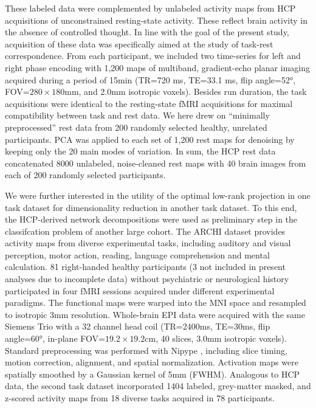 \documentclass{article} %
\begin{document}
These labeled data were complemented by unlabeled activity maps
from HCP acquisitions of unconstrained resting-state activity.
These reflect brain activity in the absence of controlled thought.
In line with the goal of the present study, acquisition of these data was
specifically aimed at the study of task-rest correspondence.
From each participant, we included two
time-series for left and right phase encoding
with 1,200 maps of multiband, gradient-echo planar imaging acquired
during a period of 15min (TR=720 ms, TE=33.1 ms, flip angle=52°,
FOV=$280\times180$mm, and 2.0mm isotropic voxels). Besides run duration,
the task acquisitions were identical to the resting-state fMRI acquisitions
for maximal compatibility between task and rest data.
We here drew on ``minimally preprocessed'' rest data
from 200 randomly selected healthy, unrelated participants.
PCA was applied to each set of 1,200 rest maps for
denoising by keeping only the 20 main modes of
variation.
In sum, the HCP rest data concatenated
8000 unlabeled, noise-cleaned rest maps with
40 brain images from each of 200 randomly selected participants.

We were further interested in the utility of the optimal low-rank projection
in one task dataset for dimensionality reduction in another task dataset.
To this end, the HCP-derived network decompositions were used as preliminary
step in the classifcation problem of another large cohort.
The ARCHI dataset \cite{pinel07} provides activity maps from
diverse experimental tasks, including auditory and visual perception, motor action,
reading, language comprehension and mental calculation.
81 right-handed healthy participants
(3 not included in present analyses due to incomplete data)
without psychiatric or
neurological history participated in four fMRI sessions acquired under
different experimental paradigms.
The functional maps were warped into
the MNI space and resampled to isotropic 3mm resolution.
Whole-brain EPI data were acquired with the same Siemens Trio with a 32
channel head coil (TR=2400ms, TE=30ms, flip angle=60°, in-plane
FOV=$19.2\times19.2$cm, 40 slices, 3.0mm isotropic voxels).
Standard preprocessing was performed with Nipype \cite{gorgo11}, including
slice timing, motion correction, alignment, and spatial normalization.
Activation maps were spatially smoothed by
a Gaussian kernel of 5mm (FWHM).
Analogous to HCP data, the second task dataset incorporated 1404
labeled, grey-matter masked, and z-scored activity maps
from 18 diverse tasks acquired in 78 participants.
\end{document}
